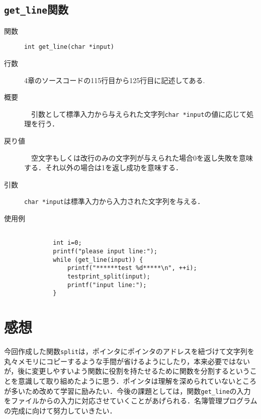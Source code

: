 \documentclass[a4j,11pt]{jarticle}
\begin{document}
\subsection{\texttt{get\_line}関数}
 \begin{description}
    \item[関数] \verb|int get_line(char *input)|
    \item[行数]  4章のソースコードの115行目から125行目に記述してある.
    \item[概要]　引数として標準入力から与えられた文字列\verb|char *input|の値に応じて処理を行う．
    \item[戻り値]　空文字もしくは改行のみの文字列が与えられた場合0を返し失敗を意味する．それ以外の場合は1を返し成功を意味する． 
    \item[引数]  \verb|char *input|は標準入力から入力された文字列を与える．
    \item[使用例]
      \begin{verbatim}

        int i=0;
        printf("please input line:");
   	    while (get_line(input)) {
   	        printf("******test %d*****\n", ++i);
   	        testprint_split(input);
   	        printf("input line:");
   	    }
      \end{verbatim}
\end{description}

 \section{感想}
 今回作成した関数\verb|split|は，ポインタにポインタのアドレスを紐づけて文字列を丸々メモリにコピーするような手間が省けるようにしたり，本来必要ではないが，後に変更しやすいよう関数に役割を持たせるために関数を分割するということを意識して取り組めたように思う．ポインタは理解を深められていないところが多いため改めて学習に励みたい．今後の課題としては，関数\verb|get_line|の入力をファイルからの入力に対応させていくことがあげられる．名簿管理プログラムの完成に向けて努力していきたい．
\end{document}
